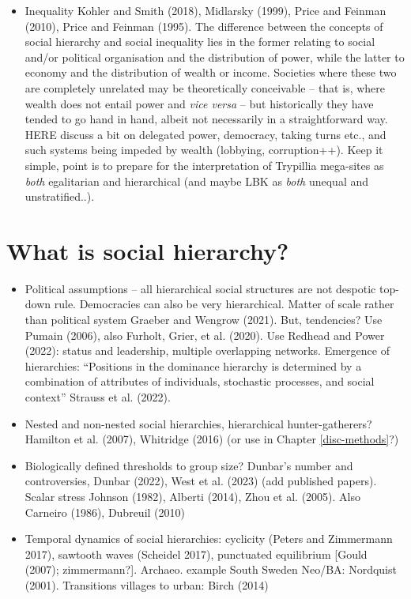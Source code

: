 \documentclass[
  12pt,
]{book}
\providecommand{\tightlist}{%
  \setlength{\itemsep}{0pt}\setlength{\parskip}{0pt}}
\begin{document}
\begin{itemize}
\tightlist
\item
  Inequality Kohler and Smith (2018), Midlarsky (1999), Price and Feinman (2010), Price and Feinman (1995). The difference between the concepts of social hierarchy and social inequality lies in the former relating to social and/or political organisation and the distribution of power, while the latter to economy and the distribution of wealth or income. Societies where these two are completely unrelated may be theoretically conceivable -- that is, where wealth does not entail power and \emph{vice versa} -- but historically they have tended to go hand in hand, albeit not necessarily in a straightforward way. HERE discuss a bit on delegated power, democracy, taking turns etc., and such systems being impeded by wealth (lobbying, corruption++). Keep it simple, point is to prepare for the interpretation of Trypillia mega-sites as \emph{both} egalitarian and hierarchical (and maybe LBK as \emph{both} unequal and unstratified..).
\end{itemize}

\hypertarget{social-hierarchy}{%
\section{What is social hierarchy?}\label{social-hierarchy}}

\begin{itemize}
\item
  Political assumptions -- all hierarchical social structures are not despotic top-down rule. Democracies can also be very hierarchical. Matter of scale rather than political system Graeber and Wengrow (2021). But, tendencies? Use Pumain (2006), also Furholt, Grier, et al. (2020). Use Redhead and Power (2022): status and leadership, multiple overlapping networks. Emergence of hierarchies: ``Positions in the dominance hierarchy is determined by a combination of attributes of individuals, stochastic processes, and social context'' Strauss et al. (2022).
\item
  Nested and non-nested social hierarchies, hierarchical hunter-gatherers? Hamilton et al. (2007), Whitridge (2016) (or use in Chapter \ref{disc-methods}?)
\item
  Biologically defined thresholds to group size? Dunbar's number and controversies, Dunbar (2022), West et al. (2023) (add published papers). Scalar stress Johnson (1982), Alberti (2014), Zhou et al. (2005). Also Carneiro (1986), Dubreuil (2010)
\item
  Temporal dynamics of social hierarchies: cyclicity (Peters and Zimmermann 2017), sawtooth waves (Scheidel 2017), punctuated equilibrium {[}Gould (2007); zimmermann?{]}. Archaeo. example South Sweden Neo/BA: Nordquist (2001). Transitions villages to urban: Birch (2014)
\end{itemize}
\end{document}
